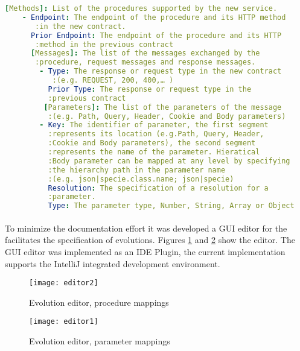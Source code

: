 \begin{lstlisting}[language=yaml, caption=Evolution specification structure, label=lst:evolution_yal]
[Methods]: List of the procedures supported by the new service.
    - Endpoint: The endpoint of the procedure and its HTTP method
       :in the new contract.
      Prior Endpoint: The endpoint of the procedure and its HTTP
       :method in the previous contract
      [Messages]: The list of the messages exchanged by the
       :procedure, request messages and response messages.
        - Type: The response or request type in the new contract
           :(e.g. REQUEST, 200, 400,… )
          Prior Type: The response or request type in the
          :previous contract
         [Parameters]: The list of the parameters of the message
          :(e.g. Path, Query, Header, Cookie and Body parameters)
        - Key: The identifier of parameter, the first segment
          :represents its location (e.g.Path, Query, Header,
          :Cookie and Body parameters), the second segment
          :represents the name of the parameter. Hieratical
          :Body parameter can be mapped at any level by specifying
          :the hierarchy path in the parameter name
          :(e.g. json|specie.class.name; json|specie)
          Resolution: The specification of a resolution for a
          :parameter.
          Type: The parameter type, Number, String, Array or Object
\end{lstlisting}

\paragraph{}

To minimize the documentation effort it was developed a GUI editor for the facilitates the specification of evolutions.
Figures \ref{fig:editor1} and \ref{fig:editor2} show the editor.
The GUI editor was implemented as an IDE Plugin, the current implementation supports the IntelliJ integrated development environment.

\begin{figure}[htbp]
    \centering
    \centerline{\texttt{[image: editor2]}}
    \caption{Evolution editor, procedure mappings}
    \label{fig:editor1}
\end{figure}

\begin{figure}[htbp]
    \centering
    \centerline{\texttt{[image: editor1]}}
    \caption{Evolution editor, parameter mappings}
    \label{fig:editor2}
\end{figure}

